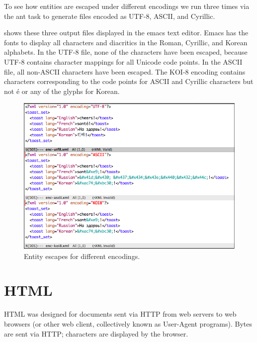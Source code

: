 To see how entities are escaped under different encodings
we run  three times via the ant task 
to generate files encoded as UTF-8, ASCII, and Cyrillic.
%

 shows
these three output files displayed in the emacs text editor.
Emacs has the fonts to display all characters and diacritics in
the Roman, Cyrillic, and Korean alphabets.
In the UTF-8 file, none of the characters have been escaped, because
UTF-8 contains character mappings for all Unicode code points.
In the ASCII file, all non-ASCII characters have been escaped.
The KOI-8 encoding contains characters corresponding to
the code points for ASCII and Cyrillic characters
but not \'{e} or any of the glyphs for Korean.

\begin{figure}
\includegraphics[width=5.0in]{pngs/xmlencodings.png}
\vspace*{-18pt}
\caption{Entity escapes for different encodings.}\label{fig:xml-escapes}
\end{figure}

\section{HTML}

HTML was designed for documents sent via HTTP from web servers
to web browsers (or other web client, collectively known as User-Agent programs).
Bytes are sent via HTTP; characters are displayed by the browser.

